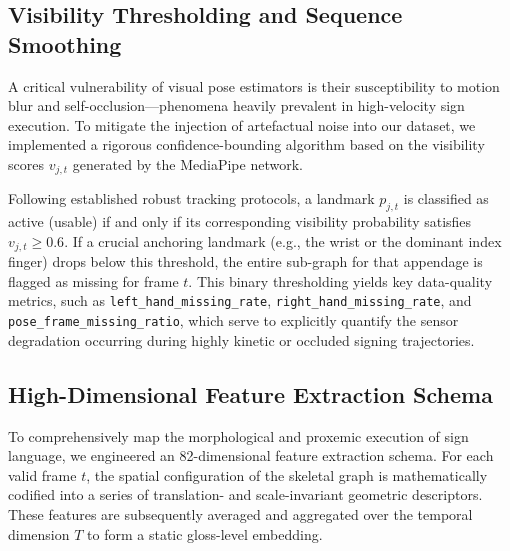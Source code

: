 \documentclass{ieeeaccess}
\begin{document}
\subsection{Visibility Thresholding and Sequence Smoothing} 
A critical vulnerability of visual pose estimators is their susceptibility to motion blur and self-occlusion—phenomena heavily prevalent in high-velocity sign execution. To mitigate the injection of artefactual noise into our dataset, we implemented a rigorous confidence-bounding algorithm based on the visibility scores $v_{j,t}$ generated by the MediaPipe network. 

Following established robust tracking protocols, a landmark $p_{j,t}$ is classified as active (usable) if and only if its corresponding visibility probability satisfies $v_{j,t} \ge 0.6$. If a crucial anchoring landmark (e.g., the wrist or the dominant index finger) drops below this threshold, the entire sub-graph for that appendage is flagged as missing for frame $t$. This binary thresholding yields key data-quality metrics, such as \texttt{left\_hand\_missing\_rate}, \texttt{right\_hand\_missing\_rate}, \newline and \texttt{pose\_frame\_missing\_ratio}, which serve to explicitly quantify the sensor degradation occurring during highly kinetic or occluded signing trajectories. 

\subsection{High-Dimensional Feature Extraction Schema} 
To comprehensively map the morphological and proxemic execution of sign language, we engineered an 82-dimensional feature extraction schema. For each valid frame $t$, the spatial configuration of the skeletal graph is mathematically codified into a series of translation- and scale-invariant geometric descriptors. These features are subsequently averaged and aggregated over the temporal dimension $T$ to form a static gloss-level embedding.
\end{document}
